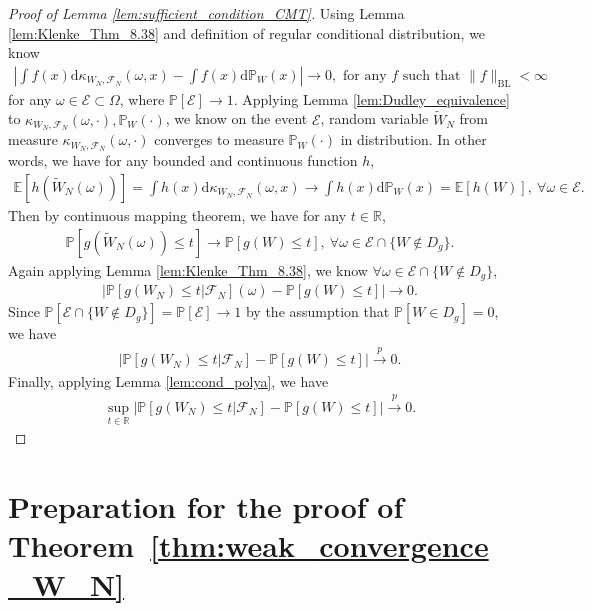 \documentclass[12pt]{article}
\def\P{\mathbb{P}}
\def\P{\mathbb{P}}
\newcommand{\E}{\mathbb E}								%
\renewcommand{\P}{\mathbb{P}}							%
\newcommand{\convp}{\overset p \rightarrow}             %
\begin{document}
\begin{proof}[Proof of Lemma \ref{lem:sufficient_condition_CMT}]
	Using Lemma \ref{lem:Klenke_Thm_8.38} and definition of regular conditional distribution, we know 
	\begin{align*}
		\left|\int f(x)\mathrm{d}\kappa_{W_N,\mathcal{F}_N}(\omega,x)-\int f(x)\mathrm{d}\mathbb{P}_W(x)\right|\rightarrow0,\text{ for any }f\text{ such that } \|f\|_{\mathrm{BL}}<\infty
	\end{align*}
	for any $\omega\in\mathcal{E}\subset\Omega$, where $\P[\mathcal{E}]\rightarrow1$. Applying Lemma \ref{lem:Dudley_equivalence} to $\kappa_{W_N,\mathcal{F}_N}(\omega,\cdot),\P_W(\cdot)$, we know on the event $\mathcal{E}$, random variable $\tilde{W}_N$ from measure $\kappa_{W_N,\mathcal{F}_N}(\omega,\cdot)$ converges to measure $\P_W(\cdot)$ in distribution. In other words, we have for any bounded and continuous function $h$,
	\begin{align*}
		\E[h(\tilde{W}_N(\omega))]=\int h(x)\mathrm{d}\kappa_{W_N,\mathcal{F}_N}(\omega,x)\rightarrow \int h(x)\mathrm{d}\mathbb{P}_W(x)=\E[h(W)],\ \forall \omega\in\mathcal{E}.
	\end{align*}
	Then by continuous mapping theorem, we have for any $t\in\mathbb{R}$,
	\begin{align*}
		\P[g(\tilde{W}_N(\omega))\leq t]\rightarrow \P[g( W)\leq t],\ \forall \omega\in\mathcal{E}\cap \{W\notin D_g\}.
	\end{align*}
	Again applying Lemma \ref{lem:Klenke_Thm_8.38}, we know $\forall \omega\in\mathcal{E}\cap \{W\notin D_g\}$,
	\begin{align*}
		\left|\P[g(W_N)\leq t|\mathcal{F}_N](\omega)-\P[g(W)\leq t]\right|\rightarrow 0.
	\end{align*}
	Since $\P[\mathcal{E}\cap \{W\notin D_g\}]=\P[\mathcal{E}]\rightarrow 1$ by the assumption that $\P[W\in D_g]=0$, we have 
	\begin{align*}
		\left|\P[g(W_N)\leq t|\mathcal{F}_N]-\P[g(W)\leq t]\right|\convp 0.
	\end{align*}
	Finally, applying Lemma \ref{lem:cond_polya}, we have
	\begin{align*}
		\sup_{t\in\mathbb{R}}\left|\P[g(W_N)\leq t|\mathcal{F}_N]-\P[g(W)\leq t]\right|\convp 0.
	\end{align*}
\end{proof}

\section{Preparation for the proof of Theorem~\ref{thm:weak_convergence_W_N}}
\end{document}
